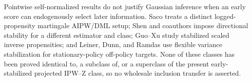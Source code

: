 Pointwise self-normalized results do not justify Gaussian inference when an early score can endogenously select later information. Saco treats a distinct logged-propensity martingale AIPW/DML setup; Shen and coauthors impose directional stability for a different estimator and class; Guo--Xu study stabilized scaled inverse propensities; and Leiner, Dunn, and Ramdas use flexible variance stabilization for stationary-policy off-policy targets. None of these classes has been proved identical to, a subclass of, or a superclass of the present early-stabilized projected IPW--Z class, so no wholesale inclusion transfer is asserted.